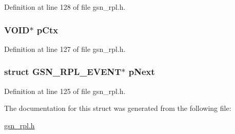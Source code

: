 Definition at line 128 of file gsn\_\-rpl.h.

\hypertarget{a00200_a5ef049defd7cc5565bb3c81588802ef7}{
\subsubsection[{pCtx}]{\setlength{\rightskip}{0pt plus 5cm}VOID$\ast$ {\bf pCtx}}}
\label{a00200_a5ef049defd7cc5565bb3c81588802ef7}


Definition at line 127 of file gsn\_\-rpl.h.

\hypertarget{a00200_af25185f81ec5a082d348c68e7c233c06}{
\subsubsection[{pNext}]{\setlength{\rightskip}{0pt plus 5cm}struct {\bf GSN\_\-RPL\_\-EVENT}$\ast$ {\bf pNext}}}
\label{a00200_af25185f81ec5a082d348c68e7c233c06}


Definition at line 125 of file gsn\_\-rpl.h.



The documentation for this struct was generated from the following file:\begin{DoxyCompactItemize}
\item 
\hyperlink{a00579}{gsn\_\-rpl.h}\end{DoxyCompactItemize}
